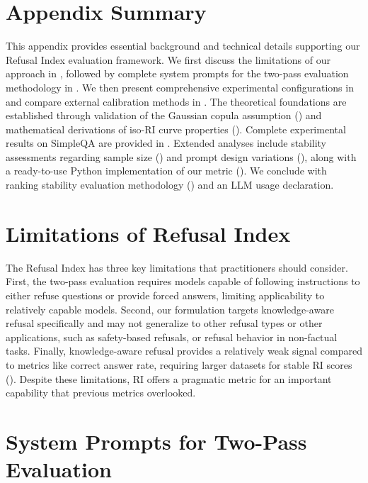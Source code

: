 \newpage
\appendix

\section*{Appendix Summary}
This appendix provides essential background and technical details supporting our Refusal Index evaluation framework. We first discuss the limitations of our approach in , followed by complete system prompts for the two-pass evaluation methodology in . We then present comprehensive experimental configurations in  and compare external calibration methods in . The theoretical foundations are established through validation of the Gaussian copula assumption () and mathematical derivations of iso-RI curve properties (). Complete experimental results on SimpleQA are provided in . Extended analyses include stability assessments regarding sample size () and prompt design variations (), along with a ready-to-use Python implementation of our metric (). We conclude with ranking stability evaluation methodology () and an LLM usage declaration.

\section{Limitations of Refusal Index} 
\label{app:limitations_of_ri}
The Refusal Index has three key limitations that practitioners should consider. 
First, the two-pass evaluation requires models capable of following instructions to either refuse questions or provide forced answers, limiting applicability to relatively capable models. 
Second, our formulation targets knowledge-aware refusal specifically and may not generalize to other refusal types or other applications, such as safety-based refusals, or refusal behavior in non-factual tasks. 
Finally, knowledge-aware refusal provides a relatively weak signal compared to metrics like correct answer rate, requiring larger datasets for stable RI scores ().
Despite these limitations, RI offers a pragmatic metric for an important capability that previous metrics overlooked.

\section{System Prompts for Two-Pass Evaluation}
\label{app:system_prompts}

